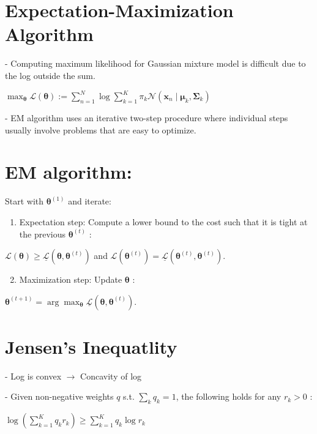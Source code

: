 
\section*{Expectation-Maximization Algorithm}
- Computing maximum likelihood for Gaussian mixture model is difficult due to the log outside the sum.

$\max _{\boldsymbol{\theta}} \mathcal{L}(\boldsymbol{\theta}):=\sum_{n=1}^{N} \log \sum_{k=1}^{K} \pi_{k} \mathcal{N}\left(\mathbf{x}_{n} \mid \boldsymbol{\mu}_{k}, \boldsymbol{\Sigma}_{k}\right)$

- EM algorithm uses an iterative two-step procedure where individual steps usually involve problems that are easy to optimize.

\section*{EM algorithm:}
Start with $\boldsymbol{\theta}^{(1)}$ and iterate:

\begin{enumerate}
  \item Expectation step: Compute a lower bound to the cost such that it is tight at the previous $\boldsymbol{\theta}^{(t)}$ :
\end{enumerate}

$\mathcal{L}(\boldsymbol{\theta}) \geq \underline{\mathcal{L}}\left(\boldsymbol{\theta}, \boldsymbol{\theta}^{(t)}\right)$ and
$\mathcal{L}\left(\boldsymbol{\theta}^{(t)}\right)=\underline{\mathcal{L}}\left(\boldsymbol{\theta}^{(t)}, \boldsymbol{\theta}^{(t)}\right)$.

\begin{enumerate}
  \setcounter{enumi}{1}
  \item Maximization step: Update $\boldsymbol{\theta}$ :
\end{enumerate}

$
\boldsymbol{\theta}^{(t+1)}=\arg \max _{\boldsymbol{\theta}} \underline{\mathcal{L}}\left(\boldsymbol{\theta}, \boldsymbol{\theta}^{(t)}\right) .
$

\section*{Jensen's Inequatlity}
- Log is convex $\rightarrow$ Concavity of log

- Given non-negative weights $q$ s.t. $\sum_{k} q_{k}=1$, the following holds for any $r_{k}>0$ :

$\log \left(\sum_{k=1}^{K} q_{k} r_{k}\right) \geq \sum_{k=1}^{K} q_{k} \log r_{k}$

